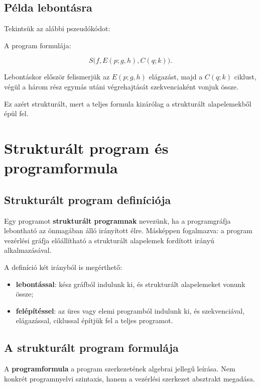 \subsection{Példa lebontásra}

Tekintsük az alábbi pszeudókódot:


A program formulája:

\[
S\bigl(f, E(p;g,h), C(q;k)\bigr).
\]

Lebontáskor először felismerjük az $E(p;g,h)$ elágazást, majd a $C(q;k)$ ciklust, végül a három rész egymás utáni végrehajtását szekvenciaként vonjuk össze.

Ez azért strukturált, mert a teljes formula kizárólag a strukturált alapelemekből épül fel.

\section{Strukturált program és programformula}

\subsection{Strukturált program definíciója}

Egy programot \textbf{strukturált programnak} nevezünk, ha a programgráfja lebontható az önmagában álló irányított élre. Másképpen fogalmazva: a program vezérlési gráfja előállítható a strukturált alapelemek fordított irányú alkalmazásával.

A definíció két irányból is megérthető:

\begin{itemize}
  \item \textbf{lebontással}: kész gráfból indulunk ki, és strukturált alapelemeket vonunk össze;
  \item \textbf{felépítéssel}: az üres vagy elemi programból indulunk ki, és szekvenciával, elágazással, ciklussal építjük fel a teljes programot.
\end{itemize}

\subsection{A strukturált program formulája}

A \textbf{programformula} a program szerkezetének algebrai jellegű leírása. Nem konkrét programnyelvi szintaxis, hanem a vezérlési szerkezet absztrakt megadása.


